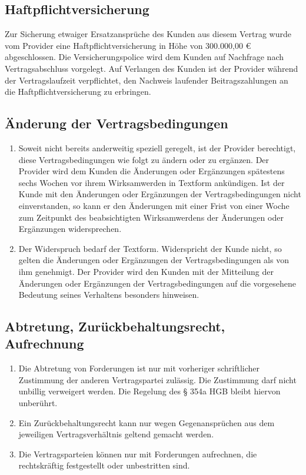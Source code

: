 \documentclass{terms}
\begin{document}
\subsection{Haftpflichtversicherung}
Zur Sicherung etwaiger Ersatzansprüche des Kunden aus diesem Vertrag wurde vom Provider eine Haftpflichtversicherung in Höhe von 300.000,00 € abgeschlossen.
Die Versicherungspolice wird dem Kunden auf Nachfrage nach Vertragsabschluss vorgelegt.
Auf Verlangen des Kunden ist der Provider während der Vertragslaufzeit verpflichtet, den Nachweis laufender Beitragszahlungen an die Haftpflichtversicherung zu erbringen.

\subsection{Änderung der Vertragsbedingungen}
\begin{enumerate}
\item Soweit nicht bereits anderweitig speziell geregelt, ist der Provider berechtigt, diese Vertragsbedingungen wie folgt zu ändern oder zu ergänzen.
      Der Provider wird dem Kunden die Änderungen oder Ergänzungen spätestens sechs Wochen vor ihrem Wirksamwerden in Textform ankündigen.
      Ist der Kunde mit den Änderungen oder Ergänzungen der Vertragsbedingungen nicht einverstanden, so kann er den Änderungen mit einer Frist von einer Woche zum Zeitpunkt des beabsichtigten Wirksamwerdens der Änderungen oder Ergänzungen widersprechen.
\item Der Widerspruch bedarf der Textform.
      Widerspricht der Kunde nicht, so gelten die Änderungen oder Ergänzungen der Vertragsbedingungen als von ihm genehmigt.
      Der Provider wird den Kunden mit der Mitteilung der Änderungen oder Ergänzungen der Vertragsbedingungen auf die vorgesehene Bedeutung seines Verhaltens besonders hinweisen.
\end{enumerate}

\subsection{Abtretung, Zurückbehaltungsrecht, Aufrechnung}
\begin{enumerate}
\item Die Abtretung von Forderungen ist nur mit vorheriger schriftlicher Zustimmung der anderen Vertragspartei zulässig.
      Die Zustimmung darf nicht unbillig verweigert werden.
      Die Regelung des § 354a HGB bleibt hiervon unberührt.
\item Ein Zurückbehaltungsrecht kann nur wegen Gegenansprüchen aus dem jeweiligen Vertragsverhältnis geltend gemacht werden.
\item Die Vertragsparteien können nur mit Forderungen aufrechnen, die rechtskräftig festgestellt oder unbestritten sind.
\end{enumerate}
\end{document}
